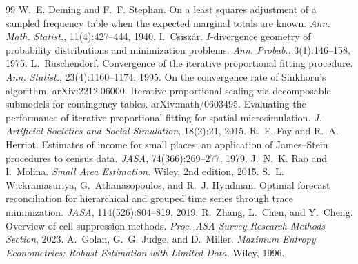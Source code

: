\documentclass[11pt]{article}
\begin{document}
\begin{thebibliography}{99}
 W.~E. Deming and F.~F. Stephan. On a least squares
adjustment of a sampled frequency table when the expected marginal totals are
known. \emph{Ann. Math. Statist.}, 11(4):427--444, 1940.
 I.~Csisz\'ar. $I$-divergence geometry of probability
distributions and minimization problems. \emph{Ann. Probab.}, 3(1):146--158, 1975.
 L.~R\"uschendorf. Convergence of the iterative
proportional fitting procedure. \emph{Ann. Statist.}, 23(4):1160--1174, 1995.
 On the convergence rate of Sinkhorn's algorithm.
arXiv:2212.06000.
 Iterative proportional scaling via decomposable submodels
for contingency tables. arXiv:math/0603495.
 Evaluating the performance of iterative proportional fitting
for spatial microsimulation. \emph{J. Artificial Societies and Social
Simulation}, 18(2):21, 2015.
 R.~E. Fay and R.~A. Herriot. Estimates of income for
small places: an application of James--Stein procedures to census data.
\emph{JASA}, 74(366):269--277, 1979.
 J.~N.~K. Rao and I.~Molina. \emph{Small Area Estimation}.
Wiley, 2nd edition, 2015.
 S.~L. Wickramasuriya, G.~Athanasopoulos, and R.~J. Hyndman.
Optimal forecast reconciliation for hierarchical and grouped time series through
trace minimization. \emph{JASA}, 114(526):804--819, 2019.
 R.~Zhang, L.~Chen, and Y.~Cheng. Overview of cell
suppression methods. \emph{Proc. ASA Survey Research Methods Section}, 2023.
 A.~Golan, G.~G. Judge, and D.~Miller. \emph{Maximum Entropy
Econometrics: Robust Estimation with Limited Data}. Wiley, 1996.
\end{thebibliography}
\end{document}
